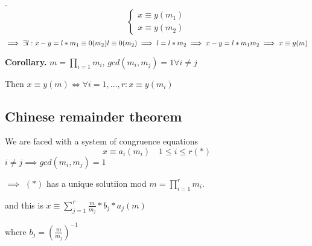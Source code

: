 \ProofBackward.
\[
  \begin{cases}
    x \equiv y (m_1) \\
    x \equiv y (m_2) 
  \end{cases}
\]
\[
  \implies \exists l: x-y = l* m_1 \equiv 0 (m_2)\\
  l \equiv 0 (m_2) \implies l = l * m_2 
    \implies x-y = l* m_1 m_2
    \implies x \equiv y (m)
\]

\textbf{Corollary.}
$m = \prod_{i=1} m_i$, $ gcd(m_i, m_j) = 1 \forall i \neq j$

Then $x \equiv y (m) \iff \forall i = 1, \ldots, r : x \equiv y (m_i)$

\subsection{Chinese remainder theorem}
We are faced with a system of congruence equations
\[
  x \equiv a_i (m_i) \quad 1 \leq i \leq r (*)
\]
$i \neq j \implies gcd(m_i, m_j) = 1$

$\implies$ $(*)$ has a unique solutiion mod $m = \prod_{i = 1}^r m_i$.

and this is $x \equiv \sum_{j=1}^r \frac {m}{m_j} * b_j * a_j (m)$

where $b_j = \left( \frac{m}{m_j} \right) ^{-1}$
